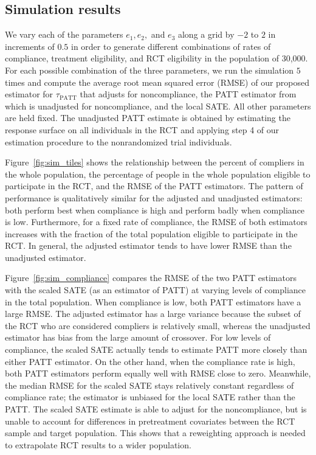\documentclass[12pt]{article}
\begin{document}
\subsection{Simulation results}

We vary each of the parameters $e_1, e_2,$ and $e_3$ along a grid by $-2$ to $2$ in increments of $0.5$ in order to generate different combinations of rates of compliance, treatment eligibility, and RCT eligibility in the population of 30,000.  For each possible combination of the three parameters, we run the simulation $5$ times and compute the average root mean squared error (RMSE) of our proposed estimator for $\tau_{\text{PATT}}$ that adjusts for noncompliance, the PATT estimator from \citet{Hartman} which is unadjusted for noncompliance, and the local SATE.  All other parameters are held fixed. The unadjusted PATT estimate is obtained by estimating the response surface on all individuals in the RCT and applying step 4 of our estimation procedure to the nonrandomized trial individuals. 

Figure~\ref{fig:sim_tiles} shows the relationship between the percent of compliers in the whole population, the percentage of people in the whole population eligible to participate in the RCT, and the RMSE of the PATT estimators.  The pattern of performance is qualitatively similar for the adjusted and unadjusted estimators: both perform best when compliance is high and perform badly when compliance is low.  Furthermore, for a fixed rate of compliance, the RMSE of both estimators increases with the fraction of the total population eligible to participate in the RCT. In general, the adjusted estimator tends to have lower RMSE than the unadjusted estimator.


Figure~\ref{fig:sim_compliance} compares the RMSE of the two PATT estimators with the scaled SATE (as an estimator of PATT) at varying levels of compliance in the total population.  When compliance is low, both PATT estimators have a large RMSE.  The adjusted estimator has a large variance because the subset of the RCT who are considered compliers is relatively small, whereas the unadjusted estimator has bias from the large amount of crossover.  For low levels of compliance, the scaled SATE actually tends to estimate PATT more closely than either PATT estimator.  On the other hand, when the compliance rate is high, both PATT estimators perform equally well with RMSE close to zero.  Meanwhile, the median RMSE for the scaled SATE stays relatively constant regardless of compliance rate; the estimator is unbiased for the local SATE rather than the PATT.  The scaled SATE estimate is able to adjust for the noncompliance, but is unable to account for differences in pretreatment covariates between the RCT sample and target population.  This shows that a reweighting approach is needed to extrapolate RCT results to a wider population.
\end{document}
